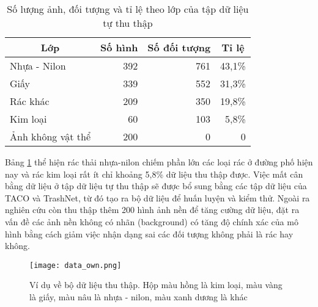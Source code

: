 \documentclass[../the.tex]{subfiles}
\begin{document}
\begin{table}[!ht]
	\centering
	\caption{Số lượng ảnh, đối tượng và tỉ lệ theo lớp của tập dữ liệu tự thu thập}
	\begin{tabular}{|l|r|r|r|}
		\hline
		\multicolumn{1}{|c|}{\textbf{Lớp}}
		                  & \multicolumn{1}{c|}{\textbf{Số hình}}
		                  & \multicolumn{1}{c|}{\textbf{Số đối tượng}}
		                  & \multicolumn{1}{c|}{\textbf{Tỉ lệ}}
		\\
		\hline

		Nhựa - Nilon      & 392                                      & 761 & 43,1\% \\
		\hline

		Giấy              & 339                                      & 552 & 31,3\% \\
		\hline

		Rác khác          & 209                                      & 350 & 19,8\% \\
		\hline

		Kim loại          & 60                                       & 103 & 5,8\%  \\
		\hline
		Ảnh không vật thể & 200                                      & 0   & 0      \\
		\hline
	\end{tabular}

	\label{tab:datasetown}
\end{table}

{\fontsize{13}{12} \selectfont

Bảng \ref{tab:datasetown} thể hiện rác thải nhựa-nilon chiếm phần lớn các loại rác ở đường phố hiện nay và rác kim loại rất ít chỉ khoảng 5,8\% dữ liệu thu thập được.
Việc mất cân bằng dữ liệu ở tập dữ liệu tự thu thập sẽ được bổ sung bằng các tập dữ liệu của TACO và TrashNet, từ đó tạo ra bộ dữ liệu để huấn luyện và kiểm thử.
Ngoài ra nghiên cứu còn thu thập thêm 200 hình ảnh nền để tăng cường dữ liệu, đặt ra vấn đề các ảnh nền không có nhãn (background) có tăng độ chính xác của mô hình bằng cách giảm việc nhận dạng sai các đối tượng không phải là rác hay không.

}


\begin{figure}[H]
	\centering
	\texttt{[image: data\_own.png]}
	\caption{Ví dụ về bộ dữ liệu thu thập. Hộp màu hồng là kim loại, màu vàng là giấy, màu nâu là nhựa - nilon, màu xanh dương là khác}
	\label{fig:dataset_own}
\end{figure}
\end{document}
